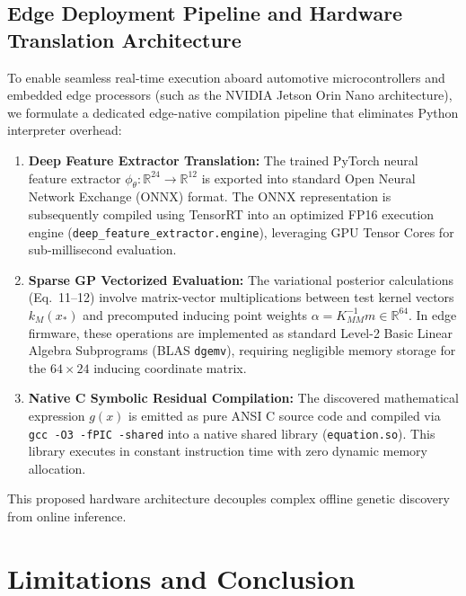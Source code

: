 \documentclass[a4paper,fleqn]{cas-sc}
\begin{document}
\subsection{Edge Deployment Pipeline and Hardware Translation Architecture}
To enable seamless real-time execution aboard automotive microcontrollers and embedded edge processors (such as the NVIDIA Jetson Orin Nano architecture), we formulate a dedicated edge-native compilation pipeline that eliminates Python interpreter overhead:
\begin{enumerate}
    \item \textbf{Deep Feature Extractor Translation:} The trained PyTorch neural feature extractor $\phi_\theta : \mathbb{R}^{24} \to \mathbb{R}^{12}$ is exported into standard Open Neural Network Exchange (ONNX) format. The ONNX representation is subsequently compiled using TensorRT into an optimized FP16 execution engine (\texttt{deep\_feature\_}\allowbreak\texttt{extractor.engine}), leveraging GPU Tensor Cores for sub-millisecond evaluation.
    \item \textbf{Sparse GP Vectorized Evaluation:} The variational posterior calculations (Eq.~11--12) involve matrix-vector multiplications between test kernel vectors $k_M(x_*)$ and precomputed inducing point weights $\alpha = K_{MM}^{-1} m \in \mathbb{R}^{64}$. In edge firmware, these operations are implemented as standard Level-2 Basic Linear Algebra Subprograms (BLAS \texttt{dgemv}), requiring negligible memory storage for the $64 \times 24$ inducing coordinate matrix.
    \item \textbf{Native C Symbolic Residual Compilation:} The discovered mathematical expression $g(x)$ is emitted as pure ANSI C source code and compiled via \texttt{gcc -O3 -fPIC -shared} into a native shared library (\texttt{equation.so}). This library executes in constant instruction time with zero dynamic memory allocation.
\end{enumerate}
This proposed hardware architecture decouples complex offline genetic discovery from online inference.

\section{Limitations and Conclusion}
\end{document}
